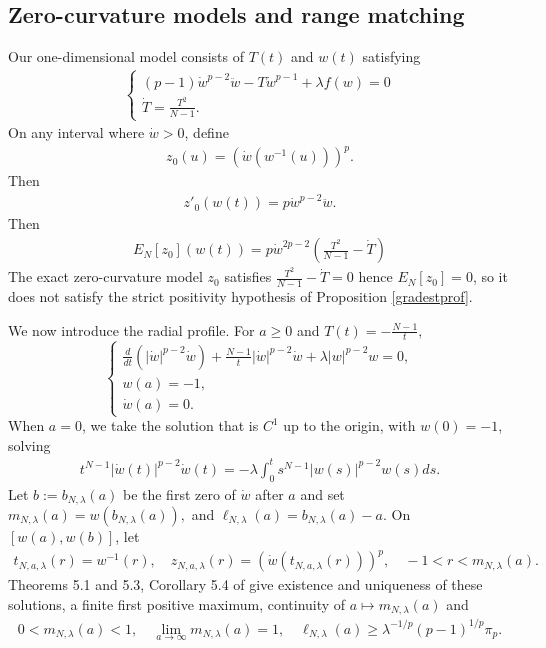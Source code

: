 \documentclass[11pt]{amsart}
\theoremstyle{definition}
\begin{document}
\subsection{Zero-curvature models and range matching}\label{residu}
Our one-dimensional model consists of $T(t)$ and $w(t)$ satisfying
\begin{align*}
    \begin{cases}
        (p-1)\dot{w}^{p-2}\ddot{w}-T\dot{w}^{p-1}+\lambda f(w)=0\\
        \dot{T}=\frac{T^2}{N-1}.
    \end{cases} 
\end{align*}
On any interval where $\dot{w}>0$, define
\begin{align*}
    z_0(u)=(\dot{w}(w^{-1}(u)))^p.
\end{align*}
Then 
\begin{align*}
    z'_0(w(t))=p\dot{w}^{p-2}\ddot{w}.
\end{align*}
Then 
\begin{align*}
    E_N[z_0](w(t))=p\dot{w}^{2p-2}\left(\frac{T^2}{N-1}-\dot{T}\right)
\end{align*}
The exact zero-curvature model $z_0$ satisfies $\frac{T^2}{N-1}-\dot{T}=0$ hence $E_N[z_0]=0$, so it does not satisfy the strict positivity hypothesis of Proposition \ref{gradestprof}. 

We now introduce the radial profile. For $a\geq 0$ and $T(t)=-\frac{N-1}{t},$
\begin{equation}
    \begin{cases}
        \frac{d}{dt}(|\dot{w}|^{p-2}\dot{w})+\frac{N-1}{t}|\dot{w}|^{p-2}\dot{w}+\lambda|w|^{p-2}w=0,\\
        w(a)=-1,\\
        \dot{w}(a)=0.
    \end{cases}
\end{equation}
When $a=0$, we take the solution that is $C^1$ up to the origin, with $w(0)=-1$, solving
\begin{align*}
    t^{N-1}|\dot{w}(t)|^{p-2}\dot{w}(t)=-\lambda\int_0^ts^{N-1}|w(s)|^{p-2}w(s)ds.
\end{align*}
Let $b:=b_{N,\lambda}(a)$ be the first zero of $\dot{w}$ after $a$ and set $m_{N,\lambda}(a)=w(b_{N,\lambda}(a)),$ and $\ell_{N,\lambda}(a)=b_{N,\lambda}(a)-a$.  On $[w(a),w(b)]$, let
\begin{align*}
    t_{N,a,\lambda}(r)=w^{-1}(r), \quad z_{N,a,\lambda}(r)=(\dot{w}(t_{N,a,\lambda}(r)))^p, \quad -1 < r < m_{N,\lambda}(a).
\end{align*}
Theorems 5.1 and 5.3, Corollary 5.4 of \cite{Valtorta2012}  give existence and uniqueness of these solutions,  a finite first positive maximum, continuity of $a\mapsto m_{N,\lambda}(a)$ and
\begin{align*}
    0<m_{N,\lambda}(a)<1, \quad \lim_{a\to \infty}m_{N,\lambda}(a)= 1, \quad \ell_{N,\lambda}(a)\geq \lambda^{-1/p}(p-1)^{1/p}\pi_p.  
\end{align*}
\end{document}

